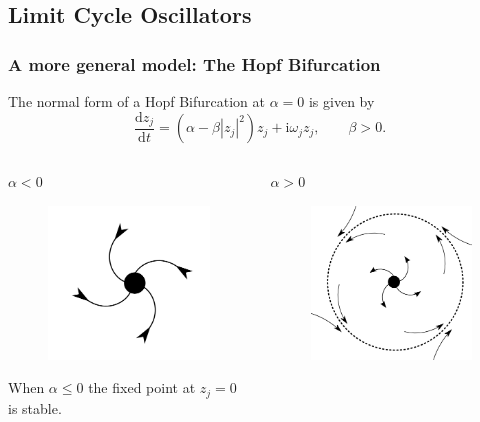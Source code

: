 \documentclass[10pt,reqno]{beamer}
\newcommand{\D}[2]{\frac{\mathrm{d} #1}{\mathrm{d} #2}}
\newcommand{\I}{\mathrm{i}}
\begin{document}
\subsection{Limit Cycle Oscillators}
\begin{frame}
\frametitle{A more general model: The Hopf Bifurcation}
The normal form of a Hopf Bifurcation at $\alpha = 0$ is given by
\[
\D{z_j}{t}= (\alpha - \beta|z_j|^2)z_j + \I\omega_j z_j, \qquad \beta >0.
\]
\begin{columns}[t]
\begin{column}{.49\textwidth}
\centering
$\alpha <0$
\begin{figure}
\includegraphics[scale = 0.16]{node.png}
\end{figure}
When $\alpha \le 0$ the fixed point at $z_j =0$ is stable.
\end{column}
\begin{column}{.49\textwidth}
\centering
$\alpha >0$
\begin{figure}
\includegraphics[scale = 0.16]{hopf.png}

\end{figure}
\end{column}
\end{columns}
\end{frame}
\end{document}
